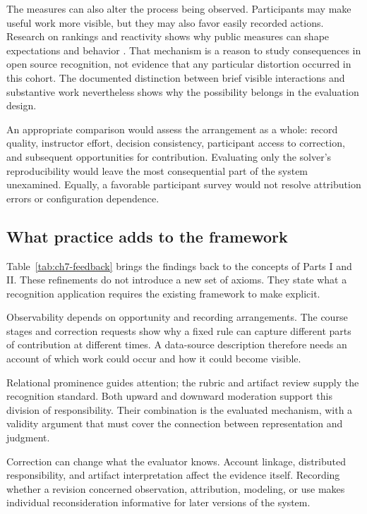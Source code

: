The measures can also alter the process being observed. Participants may make useful work more visible, but they may also favor easily recorded actions. Research on rankings and reactivity shows why public measures can shape expectations and behavior \citep{espeland2007}. That mechanism is a reason to study consequences in open source recognition, not evidence that any particular distortion occurred in this cohort. The documented distinction between brief visible interactions and substantive work nevertheless shows why the possibility belongs in the evaluation design.

An appropriate comparison would assess the arrangement as a whole: record quality, instructor effort, decision consistency, participant access to correction, and subsequent opportunities for contribution. Evaluating only the solver's reproducibility would leave the most consequential part of the system unexamined. Equally, a favorable participant survey would not resolve attribution errors or configuration dependence.

\subsection{What practice adds to the framework}
Table~\ref{tab:ch7-feedback} brings the findings back to the concepts of Parts I and II. These refinements do not introduce a new set of axioms. They state what a recognition application requires the existing framework to make explicit.



Observability depends on opportunity and recording arrangements. The course stages and correction requests show why a fixed rule can capture different parts of contribution at different times. A data-source description therefore needs an account of which work could occur and how it could become visible.

Relational prominence guides attention; the rubric and artifact review supply the recognition standard. Both upward and downward moderation support this division of responsibility. Their combination is the evaluated mechanism, with a validity argument that must cover the connection between representation and judgment.

Correction can change what the evaluator knows. Account linkage, distributed responsibility, and artifact interpretation affect the evidence itself. Recording whether a revision concerned observation, attribution, modeling, or use makes individual reconsideration informative for later versions of the system.

